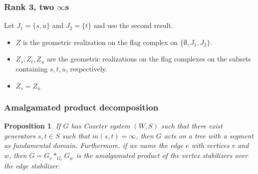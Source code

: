 \documentclass[xcolor=dvipsnames]{beamer}
\newtheorem{Prop}{Proposition}
\theoremstyle{definition}
\begin{document}
\begin{frame}
\frametitle{Rank 3, two $\infty$s}
\begin{center}
\end{center}
Let $J_1 = \{s,u\}$ and $J_2 = \{t\}$ and use the second result.
\begin{itemize}
\item $Z$ is the geometric realization on the flag complex on $\{\emptyset, J_1, J_2\}$.
\item $Z_s, Z_t, Z_u$ are the geometric realizations on the flag complexes on the subsets containing $s,t,u$, respectively.
\item $Z_s = Z_u$
\end{itemize}


\begin{center}
\end{center}
\end{frame}

\begin{frame}
\frametitle{Amalgamated product decomposition}
\begin{Prop}
If $G$ has Coxeter system $(W,S)$ such that there exist generators $s,t\in S$ such that $m(s,t) = \infty$, then $G$ acts on a tree with a segment as fundamental domain. Furthermore, if we name the edge $e$ with vertices $v$ and $w$, then $G = G_v *_{G_e} G_w$ is the amalgamated product of the vertex stabilizers over the edge stabilizer.
\end{Prop}

\begin{center}
\end{center}
\end{frame}
\end{document}
